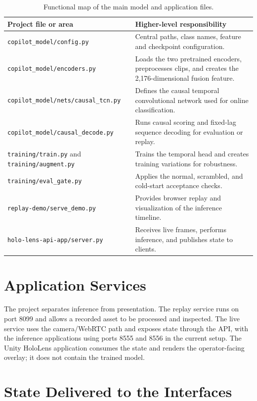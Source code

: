 \begin{table}[H]
\centering
\small
\begin{tabularx}{\textwidth}{@{}p{}X@{}}
\toprule
\textbf{Project file or area} & \textbf{Higher-level responsibility} \\
\midrule
\texttt{copilot\_model/config.py} & Central paths, class names, feature and
checkpoint configuration. \\
\texttt{copilot\_model/encoders.py} & Loads the two pretrained encoders,
preprocesses clips, and creates the 2,176-dimensional fusion feature. \\
\texttt{copilot\_model/nets/causal\_tcn.py} & Defines the causal temporal
convolutional network used for online classification. \\
\texttt{copilot\_model/causal\_decode.py} & Runs causal scoring and fixed-lag
sequence decoding for evaluation or replay. \\
\texttt{training/train.py} and \texttt{training/augment.py} & Trains the
temporal head and creates training variations for robustness. \\
\texttt{training/eval\_gate.py} & Applies the normal, scrambled, and cold-start
acceptance checks. \\
\texttt{replay-demo/serve\_demo.py} & Provides browser replay and visualization
of the inference timeline. \\
\texttt{holo-lens-api-app/server.py} & Receives live frames, performs
inference, and publishes state to clients. \\
\bottomrule
\end{tabularx}
\caption{Functional map of the main model and application files.}
\label{tab:file-map}
\end{table}

\section{Application Services}

The project separates inference from presentation. The replay service runs on
port 8099 and allows a recorded asset to be processed and inspected. The live
service uses the camera/WebRTC path and exposes state through the API, with the
inference applications using ports 8555 and 8556 in the current setup. The
Unity HoloLens application consumes the state and renders the operator-facing
overlay; it does not contain the trained model.

\section{State Delivered to the Interfaces}

